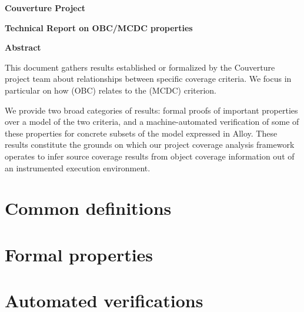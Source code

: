\documentclass[a4paper,12pt,twoside]{article}
\begin{document}
\pagestyle{empty}

\vfill

\begin{center}%
{\Large \textbf{Couverture Project}}

{\Large \textbf{Technical Report on OBC/MCDC properties}}

\vfill

{\large \textbf{Abstract}}
\end{center}

This document gathers results established or formalized by the Couverture
project team about relationships between specific coverage criteria.
%
We focus in particular on how  (OBC) relates to the
 (MCDC) criterion.

We provide two broad categories of results: formal proofs of important
properties over a model of the two criteria, and a machine-automated
verification of some of these properties for concrete subsets of the model
expressed in Alloy.
%
These results constitute the grounds on which our project coverage analysis
framework operates to infer source coverage results from object coverage
information out of an instrumented execution environment.

\vfill

\newpage
\pagestyle{plain}


\section{Common definitions}

\section{Formal properties}

\section{Automated verifications}

\newpage


\end{document}
